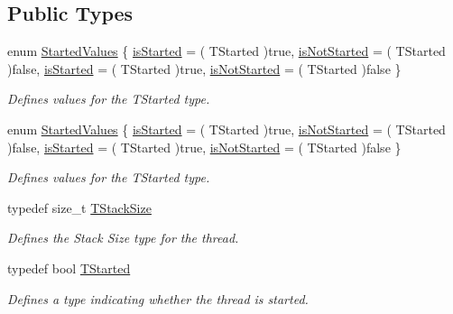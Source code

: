 \subsection*{Public Types}
\begin{DoxyCompactItemize}
\item 
enum \hyperlink{class_thread_base_a6676ad16581b715cf6d59180fd990cf1}{Started\-Values} \{ \hyperlink{class_thread_base_a6676ad16581b715cf6d59180fd990cf1a7f7568154f1d8cb41784eb6ab0bad8ab}{is\-Started} = ( T\-Started )true, 
\hyperlink{class_thread_base_a6676ad16581b715cf6d59180fd990cf1a5bc1ddd745f1071c077af32b57f587fb}{is\-Not\-Started} = ( T\-Started )false, 
\hyperlink{class_thread_base_a6676ad16581b715cf6d59180fd990cf1a7f7568154f1d8cb41784eb6ab0bad8ab}{is\-Started} = ( T\-Started )true, 
\hyperlink{class_thread_base_a6676ad16581b715cf6d59180fd990cf1a5bc1ddd745f1071c077af32b57f587fb}{is\-Not\-Started} = ( T\-Started )false
 \}
\begin{DoxyCompactList}\small\item\em Defines values for the T\-Started type. \end{DoxyCompactList}\item 
enum \hyperlink{class_thread_base_a6676ad16581b715cf6d59180fd990cf1}{Started\-Values} \{ \hyperlink{class_thread_base_a6676ad16581b715cf6d59180fd990cf1a7f7568154f1d8cb41784eb6ab0bad8ab}{is\-Started} = ( T\-Started )true, 
\hyperlink{class_thread_base_a6676ad16581b715cf6d59180fd990cf1a5bc1ddd745f1071c077af32b57f587fb}{is\-Not\-Started} = ( T\-Started )false, 
\hyperlink{class_thread_base_a6676ad16581b715cf6d59180fd990cf1a7f7568154f1d8cb41784eb6ab0bad8ab}{is\-Started} = ( T\-Started )true, 
\hyperlink{class_thread_base_a6676ad16581b715cf6d59180fd990cf1a5bc1ddd745f1071c077af32b57f587fb}{is\-Not\-Started} = ( T\-Started )false
 \}
\begin{DoxyCompactList}\small\item\em Defines values for the T\-Started type. \end{DoxyCompactList}\item 
typedef size\-\_\-t \hyperlink{class_thread_base_af45bd74387b409e15989f7eddbaf3718}{T\-Stack\-Size}
\begin{DoxyCompactList}\small\item\em Defines the Stack Size type for the thread. \end{DoxyCompactList}\item 
typedef bool \hyperlink{class_thread_base_ad8b410e3bc7320addea3c5b56ff6c985}{T\-Started}
\begin{DoxyCompactList}\small\item\em Defines a type indicating whether the thread is started. \end{DoxyCompactList}\item 

\end{DoxyCompactItemize}
